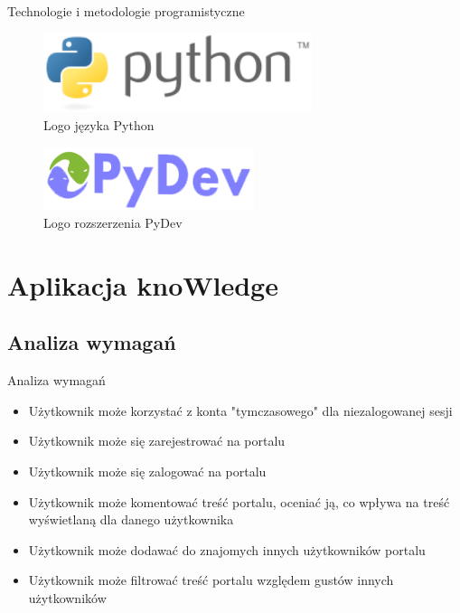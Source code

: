 \documentclass{beamer}
\begin{document}
\begin{frame}{Technologie i metodologie programistyczne}
\begin{minipage}[b]{.48\textwidth}
\begin{figure}
\includegraphics[width=0.7\textwidth]{img/py}
\caption{Logo języka Python\cite{python}}
\end{figure}
\begin{figure}
\includegraphics[width=0.55\textwidth]{img/pydev}
\caption{Logo rozszerzenia PyDev\cite{pydev}}
\end{figure}

\end{minipage}\hfill
\end{frame}

\section{Aplikacja knoWledge}

\subsection{Analiza wymagań}
\begin{frame}{Analiza wymagań} 
\begin{itemize}
\item{Użytkownik może korzystać z konta "tymczasowego" dla niezalogowanej sesji}
\item{Użytkownik może się zarejestrować na portalu}
\item{Użytkownik może się zalogować na portalu}
\item{Użytkownik może komentować treść portalu, oceniać ją, co wpływa na treść wyświetlaną dla
	danego użytkownika}
\item{Użytkownik może dodawać do znajomych innych użytkowników portalu}	
\item{Użytkownik może filtrować treść portalu względem gustów innych użytkowników}
\end{itemize}
\end{frame}
\end{document}

